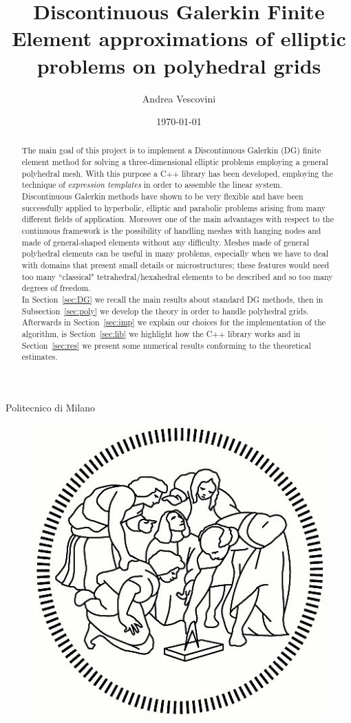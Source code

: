 \documentclass[12pt, a4paper]{article}
\title{\textbf{Discontinuous Galerkin Finite Element approximations of elliptic 
problems on polyhedral grids}}
\author{Andrea Vescovini}
\date{\today}
\theoremstyle{definition}
\theoremstyle{plain}
\theoremstyle{plain}
\theoremstyle{definition}
\begin{document}
\maketitle
\thispagestyle{empty}
\centerline{Politecnico di Milano}
\begin{figure}
	\centering
	\includegraphics[]{Logo.jpg}
\end{figure}
\newpage
\begin{abstract}
	The main goal of this project is to implement a Discontinuous Galerkin (DG) 
	finite element method for solving a three-dimensional elliptic problems
	employing a general polyhedral mesh. With this purpose a C++ library has been developed,
	employing the technique of \emph{expression templates} in order to assemble
	the linear system.\\
	Discontinuous Galerkin methods have shown to be very flexible and have been 
	successfully 
	applied to hyperbolic, elliptic and parabolic problems arising from many 
	different fields of application.
	Moreover one of the main advantages with respect to the continuous 
	framework is the possibility of handling meshes with hanging nodes and made 
	of general-shaped elements without any difficulty. Meshes made of 
	general polyhedral elements can be useful in many problems, especially when 
	we have to deal with domains that present small details or microstructures; 
	these features would need too many ``classical" tetrahedral/hexahedral 
	elements to be described and so too many degrees of freedom.\\
	In Section~\ref{sec:DG} we recall the main results about standard DG 
	methods, then in Subsection~\ref{sec:poly} we develop the theory in order 
	to 
	handle polyhedral grids. Afterwards in Section~\ref{sec:imp} we explain our 
	choices for the implementation of the algorithm, is Section~\ref{sec:lib} we highlight how the C++ library works and in Section~\ref{sec:res} 
	we present some numerical results conforming to the theoretical estimates.
\end{abstract}
\newpage
{}
\tableofcontents
\newpage
\end{document}
